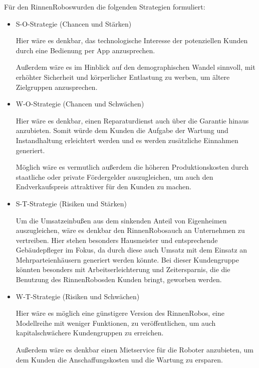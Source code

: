         \noindent Für den \as RinnenRobos\adl wurden die folgenden Strategien formuliert:
        
            \begin{itemize}
                \item S-O-Strategie (Chancen und Stärken)
                
                    Hier wäre es denkbar, das technologische Interesse der potenziellen Kunden durch eine Bedienung per App
                    anzusprechen.
        
                    Außerdem wäre es im Hinblick auf den demographischen Wandel sinnvoll, mit erhöhter Sicherheit und
                    körperlicher Entlastung zu werben, um ältere Zielgruppen anzusprechen.
        
                \item W-O-Strategie (Chancen und Schwächen)
                
                    Hier wäre es denkbar, einen Reparaturdienst auch über die Garantie hinaus anzubieten. Somit würde dem
                    Kunden die Aufgabe der Wartung und Instandhaltung erleichtert werden und es werden zusätzliche 
                    Einnahmen generiert.
                    
                    Möglich wäre es vermutlich außerdem die höheren Produktionskosten durch staatliche oder private Fördergelder
                    auszugleichen, um auch den Endverkaufspreis attraktiver für den Kunden zu machen.        
        
                \item S-T-Strategie (Risiken und Stärken)
                
                    Um die Umsatzeinbußen aus dem sinkenden Anteil von Eigenheimen auszugleichen, wäre es denkbar den 
                    \as RinnenRobos\adl auch an Unternehmen zu vertreiben. Hier stehen besonders Hausmeister und entsprechende
                    Gebäudepfleger im Fokus, da durch diese auch Umsatz mit dem Einsatz an Mehrparteienhäusern generiert werden
                    könnte. Bei dieser Kundengruppe könnten besonders mit Arbeitserleichterung und Zeitersparnis, die die
                    Benutzung des \as RinnenRobos\adl den Kunden bringt, geworben werden.
        
                \item W-T-Strategie (Risiken und Schwächen)
                
                    Hier wäre es möglich eine günstigere Version des \as RinnenRobos\adl, eine Modellreihe mit weniger
                    Funktionen, zu veröffentlichen, um auch kapitalschwächere Kundengruppen zu erreichen.
                    
                    Außerdem wäre es denkbar einen Mietservice für die Roboter anzubieten, um dem Kunden die Anschaffungskosten
                    und die Wartung zu ersparen. 
                
            \end{itemize}


